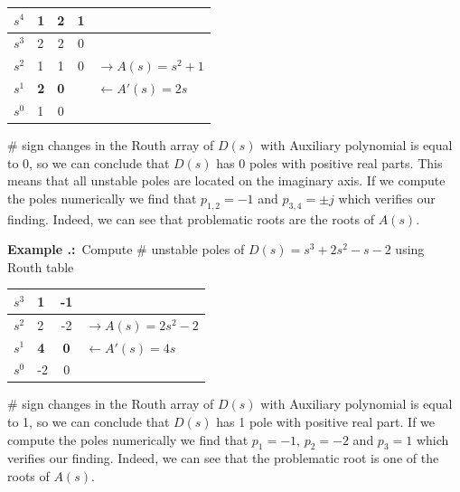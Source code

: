\documentclass[twoside]{article}
\newcounter{lecnum}
\newcounter{exno}
\newcommand{\ex}{\refstepcounter{exno}\textbf{Example \thelecnum.\theexno:}\ }
\begin{document}
\vspace{6pt}
\begin{minipage}[h]{1\linewidth}
\begin{center}
\begin{tabular}{|c || F || c c | l |}
\hline
$s^4$ & 1 & 2 & 1 &
\\ \hline
$s^3$ & 2 & 2 & 0 &
\\ \hline
$s^2$ & 1 & 1 & 0 & $\rightarrow A(s) = s^2 + 1$
\\ \hline
$s^1$ & \textbf{2} & \textbf{0} &   & $\leftarrow A'(s) = 2s$
\\ \hline
$s^0$ & 1 & 0 & &
\\ \hline
\end{tabular}
\end{center}
\end{minipage}
\vspace{6pt}

$\#$ sign changes in the Routh array of $D(s)$ with Auxiliary polynomial
is equal to 0, so we can conclude that $D(s)$ has 0 poles with
positive real parts. This means that all unstable poles are located on
the imaginary axis. If we compute the poles numerically we find that
$p_{1,2} = -1$ and $p_{3,4} = \pm j$ which verifies our finding. Indeed,
we can see that problematic roots are the roots of $A(s)$.

\vspace{6pt}

\ex Compute $\#$ unstable poles of $D(s) = s^3 + 2 s^2 - s - 2 $ using Routh table
%

\begin{center}
\begin{tabular}{|c || F || c | l |}
\hline
$s^3$ & 1 & -1 & 
\\ \hline
$s^2$ & 2 & -2 & $\rightarrow A(s) = 2 s^2 - 2$
\\ \hline
$s^1$ & \textbf{4} & \textbf{0} & $\leftarrow A'(s) = 4 s$
\\ \hline
$s^0$ & -2 & 0 & 
\\ \hline
\end{tabular}
\end{center}


$\#$ sign changes in the Routh array of $D(s)$ with Auxiliary polynomial
is equal to 1, so we can conclude that $D(s)$ has 1 pole with
positive real part. If we compute the poles numerically we find that
$p_{1} = -1$, $p_2 = -2$ and $p_{3} = 1$ which verifies our finding. Indeed,
we can see that the problematic root is one of the roots of $A(s)$.
\end{document}
